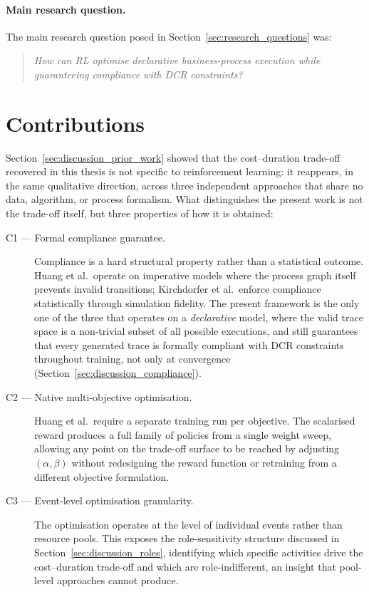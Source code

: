 \paragraph{Main research question.} The main research question posed in Section~\ref{sec:research_questions} was:

\begin{quote}
\emph{How can \ac{RL} optimise declarative business-process execution while guaranteeing compliance with \ac{DCR} constraints?}
\end{quote}


\section{Contributions}
\label{sec:contributions}

Section~\ref{sec:discussion_prior_work} showed that the cost--duration trade-off recovered in this thesis is not specific to reinforcement learning: it reappears, in the same qualitative direction, across three independent approaches that share no data, algorithm, or process formalism. What distinguishes the present work is not the trade-off itself, but three properties of how it is obtained:

\begin{description}

    \item[C1 --- Formal compliance guarantee.] Compliance is a hard structural property rather than a statistical outcome. Huang et al.\ operate on imperative models where the process graph itself prevents invalid transitions; Kirchdorfer et al.\ enforce compliance statistically through simulation fidelity. The present framework is the only one of the three that operates on a \emph{declarative} model, where the valid trace space is a non-trivial subset of all possible executions, and still guarantees that every generated trace is formally compliant with \ac{DCR} constraints throughout training, not only at convergence (Section~\ref{sec:discussion_compliance}).

    \item[C2 --- Native multi-objective optimisation.] Huang et al.\ require a separate training run per objective. The scalarised reward produces a full family of policies from a single weight sweep, allowing any point on the trade-off surface to be reached by adjusting $(\alpha, \beta)$ without redesigning the reward function or retraining from a different objective formulation.

    \item[C3 --- Event-level optimisation granularity.] The optimisation operates at the level of individual events rather than resource pools. This exposes the role-sensitivity structure discussed in Section~\ref{sec:discussion_roles}, identifying which specific activities drive the cost--duration trade-off and which are role-indifferent, an insight that pool-level approaches cannot produce.

\end{description}

